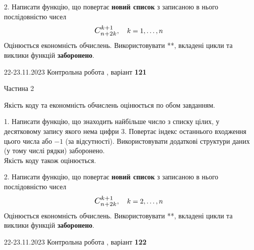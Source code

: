 \documentclass[12pt, ukrainian]{article}
\begin{document}
{{{{{{{{{{{{{{{{{{{{\begin {Large}
\vspace{10mm}



2. 
Написати функцію, що повертає \textbf{новий список} з записаною в нього послідовністю чисел
$$\scalebox{1.2}{$C_{n+2k}^{k+1}$}, \quad k=1,\ldots,n$$
Оцінюється економність обчислень. Використовувати **, вкладені цикли та виклики функцій \textbf{заборонено}.

\end{Large}\newpage




\begin {Huge}
{{22-23.11.2023 Контрольна робота , варіант  \No \textbf { 121 }\par}}

\begin{center}Частина 2
\end{center}
\vspace{10mm}
\end {Huge}

{
\begin {Large}
Якість коду та економність обчислень оцінюється по обом завданням.

\vspace{5mm}

1. Написати функцію, що знаходить найбільше число з списку цілих, у десятковому запису якого нема цифри 3. Повертає індекс останнього входження цього числа або $-1$ (за відсутності). Використовувати додаткові структури даних (у тому числі рядки) заборонено.\\	Якість коду також оцінюється. 



\vspace{10mm}



2. 
Написати функцію, що повертає \textbf{новий список} з записаною в нього послідовністю чисел
$$\scalebox{1.2}{$C_{n+2k}^{k+1}$}, \quad k=2,\ldots,n$$
Оцінюється економність обчислень. Використовувати **, вкладені цикли та виклики функцій \textbf{заборонено}.

\end{Large}\newpage




\begin {Huge}
{{22-23.11.2023 Контрольна робота , варіант  \No \textbf { 122 }\par}}


\end{Huge}}}}}}}}}}}}}}}}}}}}}}
\end{document}
